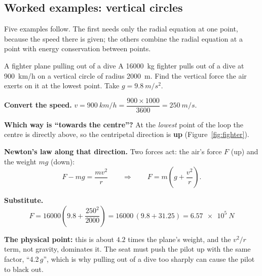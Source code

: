 \subsection{Worked examples: vertical circles}

Five examples follow. The first needs only the radial equation at one point, because the speed there is
given; the others combine the radial equation at a point with energy conservation between points.

\begin{figure}[htbp]
\centering
{}
\end{figure}

\begin{exbox}{A fighter plane pulling out of a dive}
A \SI{16000}{kg} fighter pulls out of a dive at \SI{900}{km/h} on a vertical circle of radius
\SI{2000}{m}. Find the vertical force the air exerts on it at the lowest point. Take
$g=\SI{9.8}{m/s^2}$.

 \textbf{Convert the speed.}
$v=\SI{900}{km/h}=\dfrac{900\times1000}{3600}=\SI{250}{m/s}$.

 \textbf{Which way is ``towards the centre''?} At the \emph{lowest} point of the loop the centre
is directly above, so the centripetal direction is \textbf{up} (Figure~\ref{fig:fighter}).

 \textbf{Newton's law along that direction.} Two forces act: the air's force $F$ (up) and the
weight $mg$ (down):
\[
F-mg=\frac{mv^{2}}{r}
\qquad\Longrightarrow\qquad
F=m\left(g+\frac{v^{2}}{r}\right).
\]

 \textbf{Substitute.}
\[
F=16000\left(9.8+\frac{250^{2}}{2000}\right)=16000\,(9.8+31.25)=\boxed{\SI{6.57e5}{N}}
\]

\smallskip
\textbf{The physical point:} this is about $4.2$ times the plane's weight, and the $v^{2}/r$ term, not
gravity, dominates it. The seat must push the pilot up with the same factor, ``4.2\,$g$'', which is why
pulling out of a dive too sharply can cause the pilot to black out.
\end{exbox}

